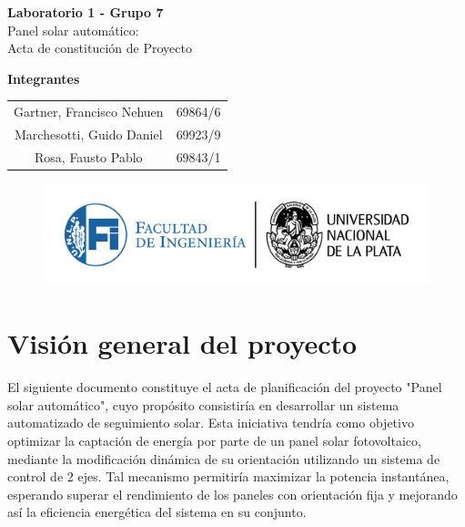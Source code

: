 \documentclass[a4paper,12pt]{article}
\begin{document}
\begin{titlepage}
    \begin{center}
        \vspace*{3cm}
        
        {\Huge \textbf{Laboratorio 1 - Grupo 7}}\\[1cm]
        {\LARGE Panel solar automático:\\ [0.5cm]Acta de constitución de Proyecto}\\[2cm]
        
        \vfill
        
        {\Large \textbf{Integrantes }}\\[.5cm]
        \large
        \begin{tabular}{c c}
            Gartner, Francisco Nehuen & 69864/6 \\
            Marchesotti, Guido Daniel & 69923/9 \\
            Rosa, Fausto Pablo & 69843/1 \\
        \end{tabular}
        
        \vspace{1cm}
        
        \begin{figure}[b]
            \centering
            \includegraphics[width=1\linewidth]{LOGOSFI-UNLP-color-01.png}
        \end{figure}
        
    \end{center}
\end{titlepage}


\section{Visión general del proyecto}


El siguiente documento constituye el acta de planificación del proyecto "Panel solar automático", cuyo propósito consistiría en desarrollar un sistema automatizado de seguimiento solar. Esta iniciativa tendría como objetivo optimizar la captación de energía por parte de un panel solar fotovoltaico, mediante la modificación dinámica de su orientación utilizando un sistema de control de 2 ejes. Tal mecanismo permitiría maximizar la potencia instantánea, esperando superar el rendimiento de los paneles con orientación fija y mejorando así la eficiencia energética del sistema en su conjunto.\\
\end{document}
